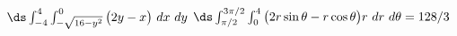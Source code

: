 {$\ds \int_{-4}^{4}\int_{-\sqrt{16-y^2}}^{0} \big(2y-x\big)\ dx\ dy$
}
{$\ds \int_{\pi/2}^{3\pi/2}\int_{0}^{4} \big(2r\sin\theta-r\cos\theta\big)r\ dr\ d\theta=128/3$
}